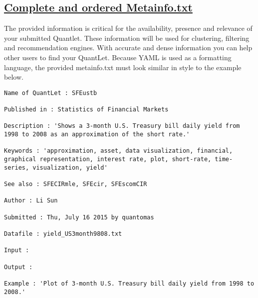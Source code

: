 \documentclass{article}
\begin{document}
\subsection{\label{MetaInfo}\hyperref[MetaInfo-ini]{Complete and ordered Metainfo.txt}}
The provided information is critical for the availability, presence and relevance of your submitted Quantlet. These information will be used for clustering, filtering and recommendation engines. With accurate and dense information you can help other users to find your QuantLet.
Because YAML is used as a formatting language, the provided metainfo.txt must look similar in style to the example below.
\begin{lstlisting}[frame=single]
Name of QuantLet : SFEustb

Published in : Statistics of Financial Markets

Description : 'Shows a 3-month U.S. Treasury bill daily yield from 1998 to 2008 as an approximation of the short rate.'

Keywords : 'approximation, asset, data visualization, financial, graphical representation, interest rate, plot, short-rate, time-series, visualization, yield'

See also : SFECIRmle, SFEcir, SFEscomCIR

Author : Li Sun

Submitted : Thu, July 16 2015 by quantomas

Datafile : yield_US3month9808.txt

Input : 

Output : 

Example : 'Plot of 3-month U.S. Treasury bill daily yield from 1998 to 2008.'
 	
\end{lstlisting}
\newpage
\end{document}
